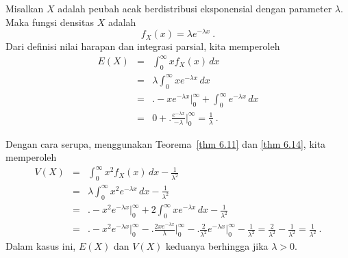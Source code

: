 {\begin{example}\label{exam 6.21} Misalkan $X$ adalah peubah acak berdistribusi
eksponensial dengan parameter $\lambda$. Maka fungsi densitas $X$ adalah
$$ f_X(x) = \lambda e^{-\lambda x}\ .
$$ Dari definisi nilai harapan dan integrasi parsial, kita memperoleh
\begin{eqnarray*} E(X) & = & \int_0^\infty x f_X(x)\, dx \\
     & = & \lambda \int_0^\infty x e^{-\lambda x}\, dx \\
     & = & \biggl.-xe^{-\lambda x}\biggr|_0^\infty + \int_0^\infty e^{-\lambda x}\,
dx \\
     & = & 0 + \biggl.\frac {e^{-\lambda x}}{-\lambda}\biggr|_0^\infty =
\frac 1\lambda\ .
\end{eqnarray*}

Dengan cara serupa, menggunakan Teorema~\ref{thm 6.11} dan \ref{thm 6.14}, kita
memperoleh
\begin{eqnarray*} V(X) & = & \int_0^\infty x^2 f_X(x)\, dx - \frac 1{\lambda^2} \\
     & = & \lambda \int_0^\infty x^2 e^{-\lambda x}\, dx - \frac 1{\lambda^2} \\
     & = & \biggl.-x^2 e^{-\lambda x}\biggr|_0^\infty + 2\int_0^\infty x e^{-\lambda
x}\, dx - \frac 1{\lambda^2} \\
     & = & \biggl.-x^2 e^{-\lambda x}\biggr|_0^\infty - \biggl.\frac {2xe^{-\lambda
x}}\lambda\biggr|_0^\infty - \biggl.\frac 2{\lambda^2} e^{-\lambda x}\biggr|_0^\infty
-
\frac 1{\lambda^2} =
\frac 2{\lambda^2} - \frac 1{\lambda^2} = \frac 1{\lambda^2}\ .
\end{eqnarray*} Dalam kasus ini, $E(X)$ dan $V(X)$ keduanya berhingga jika $\lambda > 0$.
\end{example}

}
